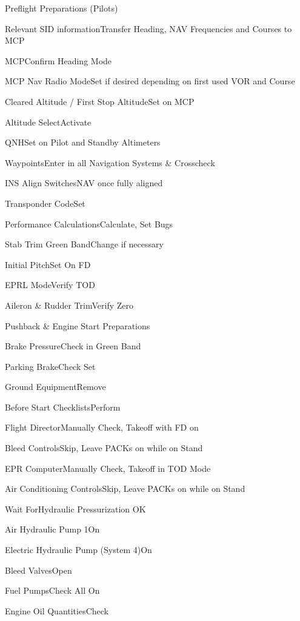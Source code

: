 \documentclass[sim-use, blue_items]{checklist}
\begin{document}
\begin{checklist}{Preflight Preparations (Pilots)}
	\item{Relevant SID information}{Transfer Heading, NAV Frequencies and Courses to MCP}
	\item{MCP}{Confirm Heading Mode}
	\item{MCP Nav Radio Mode}{Set if desired depending on first used VOR and Course}
\end{checklist}

\begin{continuedchecklist}
	\item{Cleared Altitude / First Stop Altitude}{Set on MCP}
	\item{Altitude Select}{Activate}
	\item{QNH}{Set on Pilot and Standby Altimeters}
	\item{Waypoints}{Enter in all Navigation Systems \& Crosscheck}
	\item{INS Align Switches}{NAV once fully aligned}
	\item{Transponder Code}{Set}
	\item{Performance Calculations}{Calculate, Set Bugs}
	\item{Stab Trim Green Band}{Change if necessary}
	\item{Initial Pitch}{Set On FD}
	\item{EPRL Mode}{Verify TOD}
	\item{Aileron \& Rudder Trim}{Verify Zero}
\end{continuedchecklist}

\begin{checklist}{Pushback \& Engine Start Preparations}
	\item{Brake Pressure}{Check in Green Band}
	\item{Parking Brake}{Check Set}
	\item{Ground Equipment}{Remove}
	\item{Before Start Checklists}{Perform}
	 {
		\item{Flight Director}{Manually Check, Takeoff with FD on}
		\item{Bleed Controls}{Skip, Leave PACKs on while on Stand}
		\item{EPR Computer}{Manually Check, Takeoff in TOD Mode}
		\item{Air Conditioning Controls}{Skip, Leave PACKs on while on Stand}
	}
	 {
		\item{Wait For}{Hydraulic Pressurization OK}
		\item{Air Hydraulic Pump 1}{On}
		\item{Electric Hydraulic Pump (System 4)}{On}
	}
	\item{Bleed Valves}{Open}
	\item{Fuel Pumps}{Check All On}
	\item{Engine Oil Quantities}{Check}
\end{checklist}
\end{document}
